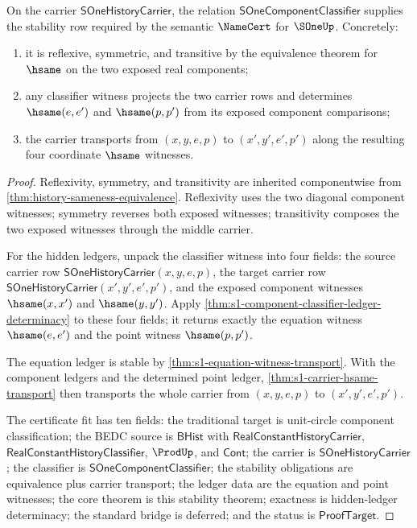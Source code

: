 \begin{theorem}
\label{thm:sone-component-classifier-stability}
On the carrier $\mathsf{SOneHistoryCarrier}$, the relation
$\mathsf{SOneComponentClassifier}$ supplies the stability row required by the
semantic $\NameCert$ for $\SOneUp$. Concretely:
\begin{enumerate}
  \item it is reflexive, symmetric, and transitive by the equivalence theorem
  for $\hsame$ on the two exposed real components;
  \item any classifier witness projects the two carrier rows and determines
  $\hsame(e,e')$ and $\hsame(p,p')$ from its exposed component comparisons;
  \item the carrier transports from $(x,y,e,p)$ to $(x',y',e',p')$ along the
  resulting four coordinate $\hsame$ witnesses.
\end{enumerate}
\end{theorem}
\begin{proof}
Reflexivity, symmetry, and transitivity are inherited componentwise from
\autoref{thm:history-sameness-equivalence}. Reflexivity uses the two diagonal
component witnesses; symmetry reverses both exposed witnesses; transitivity
composes the two exposed witnesses through the middle carrier.

For the hidden ledgers, unpack the classifier witness into four fields: the
source carrier row $\mathsf{SOneHistoryCarrier}(x,y,e,p)$, the target carrier row
$\mathsf{SOneHistoryCarrier}(x',y',e',p')$, and the exposed component witnesses
$\hsame(x,x')$ and $\hsame(y,y')$. Apply
\autoref{thm:s1-component-classifier-ledger-determinacy} to these four fields;
it returns exactly the equation witness $\hsame(e,e')$ and the point witness
$\hsame(p,p')$.

The equation ledger is stable by
\autoref{thm:s1-equation-witness-transport}. With the component ledgers and the
determined point ledger, \autoref{thm:s1-carrier-hsame-transport} then
transports the whole carrier from $(x,y,e,p)$ to $(x',y',e',p')$.

The certificate fit has ten fields: the traditional target is unit-circle
component classification; the BEDC source is $\mathsf{BHist}$ with
$\mathsf{RealConstantHistoryCarrier}$,
$\mathsf{RealConstantHistoryClassifier}$, $\ProdUp$, and $\mathsf{Cont}$; the
carrier is $\mathsf{SOneHistoryCarrier}$; the classifier is
$\mathsf{SOneComponentClassifier}$; the stability obligations are equivalence
plus carrier transport; the ledger data are the equation and point witnesses;
the core theorem is this stability theorem; exactness is hidden-ledger
determinacy; the standard bridge is deferred; and the status is
$\mathsf{ProofTarget}$.
\end{proof}

